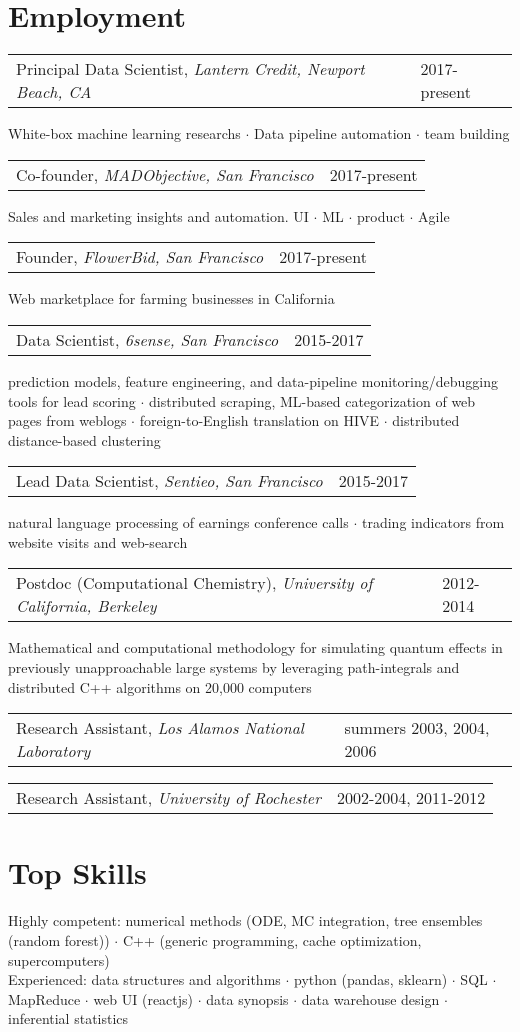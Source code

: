 \documentclass{res}
\makeatletter
\newcommand{\af}[3]{
\begin{tabular*}{\textwidth}[t]{@{}p{4.2in} l} 
    #1, \textit{#2} & #3\\
  \end{tabular*}
}
\newcommand{\aff}[4]{
\begin{tabular*}{\textwidth}[t]{@{}p{4.2in} l} 
    #1, \textit{#2} & #3\\
  \end{tabular*}
  {\color[RGB]{106,106,106} #4}\\
}
\makeatother
\begin{document}
 


\address{
  1632 Walnut St.\\
  Berkeley, CA 94709 \\
}
\address{
  (585) 313-6024\\
  kirill.igum@gmail.com\\
  \url{www.linkedin.com/in/kirilligum}
}

\begin{resume}

\section{Employment}
\aff{Principal Data Scientist}{Lantern Credit, Newport Beach, CA}{2017-present}{ 
	White-box machine learning researchs $\cdot$ Data pipeline automation $\cdot$ team building
} 
\aff{Co-founder}{MADObjective, San Francisco}{2017-present}{ 
	Sales and marketing insights and automation. UI $\cdot$ ML $\cdot$ product $\cdot$ Agile
} 
\aff{Founder}{FlowerBid, San Francisco}{2017-present}{ 
	Web marketplace for farming businesses in California
} 
\aff{Data Scientist}{6sense, San Francisco}{2015-2017}{ 
  prediction models, feature engineering, and data-pipeline monitoring/debugging tools for lead scoring $\cdot$
  distributed scraping, ML-based categorization of web pages from weblogs $\cdot$
  foreign-to-English translation on HIVE $\cdot$
  distributed distance-based clustering
} 
\aff{Lead Data Scientist}{Sentieo, San Francisco}{2015-2017}{ 
	natural language processing of earnings conference calls $\cdot$ trading indicators from website visits and web-search
} 
\aff{Postdoc (Computational Chemistry)}{University of California, Berkeley}{2012-2014}{ 
  Mathematical and computational methodology for simulating quantum effects in previously unapproachable large systems by leveraging path-integrals and distributed C++ algorithms on 20,000 computers
} 
\af{Research Assistant}{Los Alamos National Laboratory}{summers 2003, 2004, 2006}
\af{Research Assistant}{University of Rochester}{2002-2004, 2011-2012}
 
\section{Top Skills}
  Highly competent: 
	numerical methods (ODE, MC integration, tree ensembles (random forest)) $\cdot$
  C++ (generic programming, cache optimization, supercomputers)
  \\
  Experienced:
  data structures and algorithms $\cdot$
  python (pandas, sklearn)  $\cdot$
  SQL $\cdot$
  MapReduce $\cdot$
	web UI (reactjs) $\cdot$
  data synopsis $\cdot$
  data warehouse design $\cdot$
  inferential statistics 
\\

\end{resume}
\end{document}
